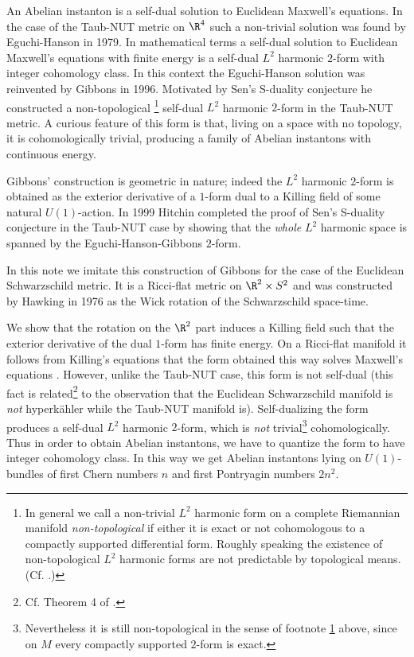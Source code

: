 \documentclass[a4paper,12pt,draft]{article}
\begin{document}
An Abelian instanton is a self-dual solution to Euclidean Maxwell's
equations. In the case of the Taub-NUT metric on $\R^4$
such a non-trivial solution was found by Eguchi-Hanson \cite{eguchi-hanson}
in 1979. In mathematical terms a self-dual solution to Euclidean Maxwell's
equations with finite energy is a self-dual $L^2$ harmonic $2$-form with
integer cohomology class. In this context the 
Eguchi-Hanson solution was reinvented by Gibbons \cite{gibbons} in 1996. 
Motivated by Sen's S-duality conjecture he constructed a non-topological
\footnote{\label{footnote} In general we call a non-trivial 
$L^2$ harmonic form on a complete Riemannian 
manifold {\em non-topological} if either it is exact or 
not cohomologous to a compactly
supported differential form. Roughly speaking the existence of 
non-topological $L^2$ harmonic forms are not predictable by topological 
means. (Cf. \cite{segal-selby}.)} self-dual $L^2$ harmonic 
$2$-form in the Taub-NUT metric. A curious feature of this form is that, 
living on a space with no topology, it is
cohomologically trivial, producing a family of Abelian instantons with 
continuous energy. 

Gibbons' construction is geometric in nature; indeed the $L^2$ harmonic 
$2$-form is obtained 
as the exterior derivative of a $1$-form dual to a Killing field of some 
natural $U(1)$-action. In 1999 Hitchin \cite{hitchin} 
completed the proof of Sen's 
S-duality conjecture in the Taub-NUT case by showing that the {\em whole} 
$L^2$ harmonic space is spanned by the Eguchi-Hanson-Gibbons $2$-form. 

In this note we imitate this construction of Gibbons for the case of the 
Euclidean Schwarzschild metric. It is a Ricci-flat metric on $\R^2\times
S^2$ \cite{wald} and was constructed by Hawking \cite{hawking} in 1976 as 
the Wick rotation  of the Schwarzschild space-time. 

We show that the rotation on the $\R^2$ part 
induces a Killing field such that the exterior derivative of the dual 
$1$-form has finite energy. On a Ricci-flat manifold it follows from 
Killing's equations that the form obtained this way solves Maxwell's 
equations \cite{wald}. 
However, unlike the Taub-NUT case, this form is not self-dual (this fact
is related\footnote{Cf. Theorem 4 of \cite{hitchin}.} 
to the observation that the Euclidean Schwarzschild manifold is 
{\it not} hyperk\"ahler while the Taub-NUT manifold is). Self-dualizing
the form produces a self-dual $L^2$ harmonic $2$-form, which is {\em not}
trivial\footnote{Nevertheless it is still non-topological in the sense of  
 footnote \ref{footnote} above, since on $M$ every compactly supported 
$2$-form is exact.} 
 cohomologically. Thus in order to obtain Abelian instantons, we
have to quantize the form to have integer cohomology class. In this way we 
get   
Abelian instantons lying on $U(1)$-bundles of first Chern numbers $n$ and 
first Pontryagin numbers $2n^2$. 
\end{document}
